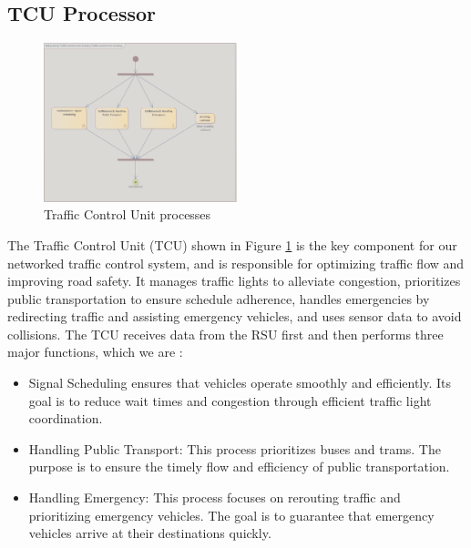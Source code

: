 \subsection{TCU Processor}
\label{sec:design_and_implementation}
\begin{figure}[ht]
    \centering
    \includegraphics[width=0.5\textwidth]{images/tcu_process.png}
    \caption{Traffic Control Unit processes }
    \label{img:tcu_process}
\end{figure}
The Traffic Control Unit (TCU) shown in Figure \ref{img:tcu_process} is the key component for our networked traffic control system, and is responsible for optimizing traffic flow and improving road safety. It manages traffic lights to alleviate congestion, prioritizes public transportation to ensure schedule adherence, handles emergencies by redirecting traffic and assisting emergency vehicles, and uses sensor data to avoid collisions. The TCU receives data from the RSU first and then performs three major functions, which we are :
\begin{itemize}
\item Signal Scheduling ensures that vehicles operate smoothly and efficiently. Its goal is to reduce wait times and congestion through efficient traffic light coordination.
\end{itemize}
\begin{itemize}
\item Handling Public Transport: This process prioritizes buses and trams. The purpose is to ensure the timely flow and efficiency of public transportation.
\end{itemize}
\begin{itemize}
    \item Handling Emergency: This process focuses on rerouting traffic and prioritizing emergency vehicles. The goal is to guarantee that emergency vehicles arrive at their destinations quickly.


\end{itemize}

